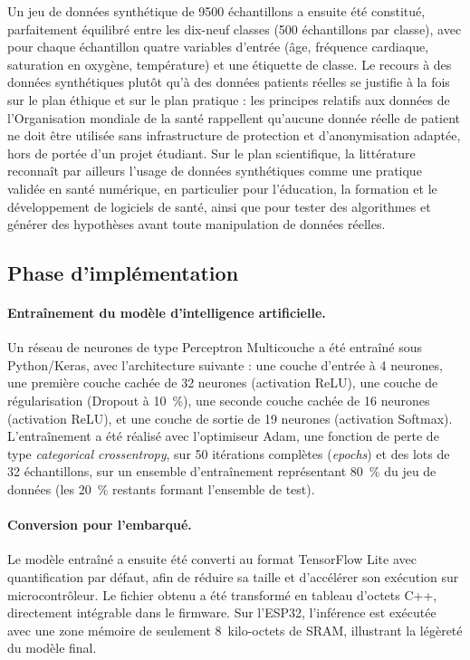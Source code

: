 \documentclass[12pt,a4paper]{report}
\begin{document}
Un jeu de données synthétique de 9500 échantillons a ensuite été constitué, parfaitement équilibré entre les dix-neuf classes (500 échantillons par classe), avec pour chaque échantillon quatre variables d'entrée (âge, fréquence cardiaque, saturation en oxygène, température) et une étiquette de classe. Le recours à des données synthétiques plutôt qu'à des données patients réelles se justifie à la fois sur le plan éthique et sur le plan pratique : les principes relatifs aux données de l'Organisation mondiale de la santé rappellent qu'aucune donnée réelle de patient ne doit être utilisée sans infrastructure de protection et d'anonymisation adaptée, hors de portée d'un projet étudiant. Sur le plan scientifique, la littérature reconnaît par ailleurs l'usage de données synthétiques comme une pratique validée en santé numérique, en particulier pour l'éducation, la formation et le développement de logiciels de santé, ainsi que pour tester des algorithmes et générer des hypothèses avant toute manipulation de données réelles.

\subsection*{Phase d'implémentation}

\paragraph{Entraînement du modèle d'intelligence artificielle.} Un réseau de neurones de type Perceptron Multicouche a été entraîné sous Python/Keras, avec l'architecture suivante : une couche d'entrée à 4 neurones, une première couche cachée de 32 neurones (activation ReLU), une couche de régularisation (Dropout à 10~\%), une seconde couche cachée de 16 neurones (activation ReLU), et une couche de sortie de 19 neurones (activation Softmax). L'entraînement a été réalisé avec l'optimiseur Adam, une fonction de perte de type \textit{categorical crossentropy}, sur 50 itérations complètes (\textit{epochs}) et des lots de 32 échantillons, sur un ensemble d'entraînement représentant 80~\% du jeu de données (les 20~\% restants formant l'ensemble de test).

\paragraph{Conversion pour l'embarqué.} Le modèle entraîné a ensuite été converti au format TensorFlow Lite avec quantification par défaut, afin de réduire sa taille et d'accélérer son exécution sur microcontrôleur. Le fichier obtenu a été transformé en tableau d'octets C++, directement intégrable dans le firmware. Sur l'ESP32, l'inférence est exécutée avec une zone mémoire de seulement 8~kilo-octets de SRAM, illustrant la légèreté du modèle final.
\end{document}
